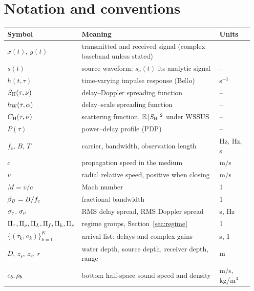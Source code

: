 
\section{Notation and conventions}
\label{sec:notation}

\begin{center}
\small
\begin{tabular}{@{}lll@{}}
\toprule
Symbol & Meaning & Units \\
\midrule
$x(t),\,y(t)$ & transmitted and received signal (complex baseband unless stated) & -- \\
$s(t)$ & source waveform; $s_a(t)$ its analytic signal & -- \\
$h(t,\tau)$ & time-varying impulse response (Bello) & s$^{-1}$ \\
$S_{\mathrm{H}}(\tau,\nu)$ & delay--Doppler spreading function & -- \\
$h_{\mathrm{W}}(\tau,\alpha)$ & delay--scale spreading function & -- \\
$C_{\mathrm{H}}(\tau,\nu)$ & scattering function, $\operatorname{\mathbb{E}}|S_{\mathrm{H}}|^2$ under WSSUS & -- \\
$P(\tau)$ & power--delay profile (PDP) & -- \\
$f_c,\,B,\,T$ & carrier, bandwidth, observation length & Hz, Hz, s \\
$c$ & propagation speed in the medium & m/s \\
$v$ & radial relative speed, positive when closing & m/s \\
$M=v/c$ & Mach number & 1 \\
$\beta_{B}=B/f_c$ & fractional bandwidth & 1 \\
$\sigma_{\tau},\,\sigma_{\nu}$ & RMS delay spread, RMS Doppler spread & s, Hz \\
$\Pi_{\tau},\Pi_{\nu},\Pi_{L},\Pi_{f},\Pi_{h},\Pi_{s}$ & regime groups, Section~\ref{sec:regime} & 1 \\
$\{(\tau_k,a_k)\}_{k=1}^{K}$ & arrival list: delays and complex gains & s, 1 \\
$D,\,z_s,\,z_r,\,r$ & water depth, source depth, receiver depth, range & m \\
$c_{b},\rho_{b}$ & bottom half-space sound speed and density & m/s, kg/m$^3$ \\
\bottomrule
\end{tabular}
\end{center}

